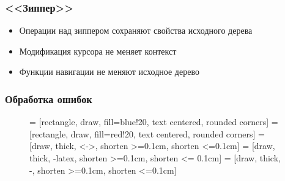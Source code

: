 \documentclass{beamer}
\begin{document}
\begin{frame}
\frametitle{<<Зиппер>>}
\begin{itemize}
\item Операции над зиппером сохраняют свойства исходного дерева
\item Модификация курсора не меняет контекст
\item Функции навигации не меняют исходное дерево
\end{itemize}
\end{frame}

\begin{frame}[fragile]
\frametitle{Обработка ошибок}

\begin{figure}[H]
\centering
{} = [rectangle, draw, fill=blue!20, text centered, rounded corners]
 = [rectangle, draw, fill=red!20, text centered, rounded corners]
 = [draw, thick, <->, shorten >=0.1cm, shorten <=0.1cm]
 = [draw, thick, -latex, shorten >=0.1cm, shorten <= 0.1cm]
 = [draw, thick, -, shorten >=0.1cm, shorten <=0.1cm]
\end{figure}
\end{frame}
\end{document}
